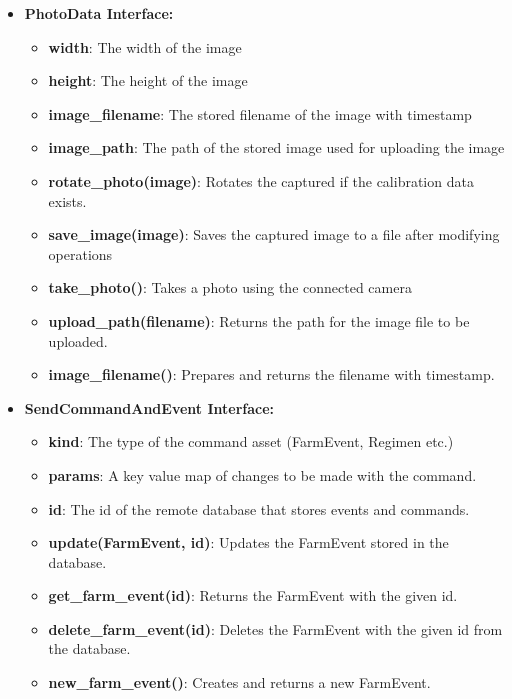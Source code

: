 \begin{itemize}
    \item \textbf{PhotoData Interface:} \begin{itemize}
        \item \textbf{width}: The width of the image
        \item \textbf{height}: The height of the image
        \item \textbf{image\_filename}: The stored filename of the image with timestamp
        \item \textbf{image\_path}: The path of the stored image used for uploading the image
        \item \textbf{rotate\_photo(image)}: Rotates the captured if the calibration data exists.
        \item \textbf{save\_image(image)}: Saves the captured image to a file after modifying operations
        \item \textbf{take\_photo()}: Takes a photo using the connected camera
        \item \textbf{upload\_path(filename)}: Returns the path for the image file to be uploaded.
        \item \textbf{image\_filename()}: Prepares and returns the filename with timestamp.
    \end{itemize}
    
    \item \textbf{SendCommandAndEvent Interface:} \begin{itemize}
        \item \textbf{kind}: The type of the command asset (FarmEvent, Regimen etc.)
        \item \textbf{params}: A key value map of changes to be made with the command.
        \item \textbf{id}: The id of the remote database that stores events and commands.
        \item \textbf{update(FarmEvent, id)}: Updates the FarmEvent stored in the database.
        \item \textbf{get\_farm\_event(id)}: Returns the FarmEvent with the given id.
        \item \textbf{delete\_farm\_event(id)}: Deletes the FarmEvent with the given id from the database.
        \item \textbf{new\_farm\_event()}: Creates and returns a new FarmEvent.
    \end{itemize}
    

\end{itemize}
